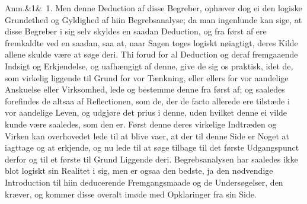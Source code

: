 \documentclass[12pt]{book}
\def\sperr#1{#1}%
\def\textit#1{#1}%
\def\emph#1{#1}%
\newcommand{\sperr}[1]{\textls[180]{#1}}
\newcommand{\anm}[1]{%
  \par\vspace{0.5\baselineskip}%
  \noindent\hspace{\parindent}\sperr{Anm.}\ifx&#1&\else~\textit{#1}.\fi
  \enspace\ignorespaces
}
\newcommand{\opage}[1]{\marginnote{\footnotesize\textit{[#1]}}}
\begin{document}
\anm{1} Men denne Deduction af disse Begreber, ophæver dog ei den logiske
Grundethed og Gyldighed af hiin Begrebsanalyse; da man ingenlunde kan sige, at
disse Begreber i sig selv skyldes en saadan Deduction, og fra først af ere
fremkaldte ved en saadan, saa at, naar Sagen toges logiskt nøiagtigt, deres Kilde
allene skulde være at søge deri. Thi forud for al Deduction og deraf fremgaaende
Indsigt og Erkjendelse, og uafhængigt af denne, give de sig os \emph{praktisk},
idet de, som virkelig liggende til Grund for vor Tænkning, eller ellers for vor
aandelige
\opage{222} %
Anskuelse eller Virksomhed, lede og bestemme denne fra først af; og saaledes forefindes
de altsaa af Reflectionen, som de, der \textit{de facto} allerede ere tilstæde i vor
aandelige Leven, og udgjøre det \textit{prius} i denne, uden hvilket denne ei vilde
kunde være saaledes, som den er. Først denne deres virkelige Indtræden og Virken kan
overhovedet lede til at blive vaer, at der til denne Side er Noget at iagttage og at
erkjende, og nu lede til at søge tilbage til det første Udgangspunct derfor og til et
første til Grund Liggende deri. Begrebsanalysen har saaledes ikke blot logiskt sin
Realitet i sig, men er ogsaa den bedste, ja den nødvendige Introduction til hiin
deducerende Fremgangsmaade og de Undersøgelser, den kræver, og kommer disse overalt
imøde med Opklaringer fra sin Side.
\end{document}
